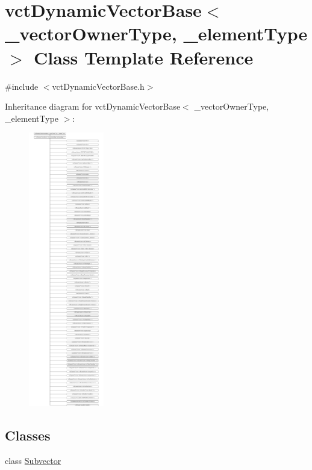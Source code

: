 \hypertarget{classvct_dynamic_vector_base}{}\section{vct\+Dynamic\+Vector\+Base$<$ \+\_\+vector\+Owner\+Type, \+\_\+element\+Type $>$ Class Template Reference}
\label{classvct_dynamic_vector_base}


{\ttfamily \#include $<$vct\+Dynamic\+Vector\+Base.\+h$>$}

Inheritance diagram for vct\+Dynamic\+Vector\+Base$<$ \+\_\+vector\+Owner\+Type, \+\_\+element\+Type $>$\+:\begin{figure}[H]
\begin{center}
\leavevmode
\includegraphics[height=12.000000cm]{d5/dc5/classvct_dynamic_vector_base}
\end{center}
\end{figure}
\subsection*{Classes}
\begin{DoxyCompactItemize}
\item 
class \hyperlink{classvct_dynamic_vector_base_1_1_subvector}{Subvector}
\end{DoxyCompactItemize}
